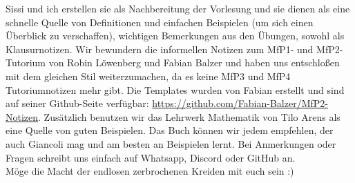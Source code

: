 Sissi und ich erstellen sie als Nachbereitung der Vorlesung und sie dienen als eine schnelle Quelle von Definitionen und einfachen Beispielen (um sich einen Überblick zu verschaffen), wichtigen Bemerkungen aus den Übungen, sowohl als Klausurnotizen. Wir bewundern die informellen Notizen zum MfP1- und MfP2-Tutorium von Robin Löwenberg und Fabian Balzer und haben uns entschloßen mit dem gleichen Stil weiterzumachen, da es keine MfP3 und MfP4 Tutoriumnotizen mehr gibt. Die Templates wurden von Fabian erstellt und sind auf seiner Github-Seite verfügbar:  \url{https://github.com/Fabian-Balzer/MfP2-Notizen}. Zusätzlich benutzen wir das Lehrwerk Mathematik von Tilo Arens als eine Quelle von guten Beispielen. Das Buch können wir jedem empfehlen, der auch Giancoli mag und am besten an Beispielen lernt. Bei Anmerkungen oder Fragen schreibt uns einfach auf Whatsapp, Discord oder GitHub an. \\ 

Möge die Macht der endlosen zerbrochenen Kreiden mit euch sein :)

\cfoot{\pagemark}
